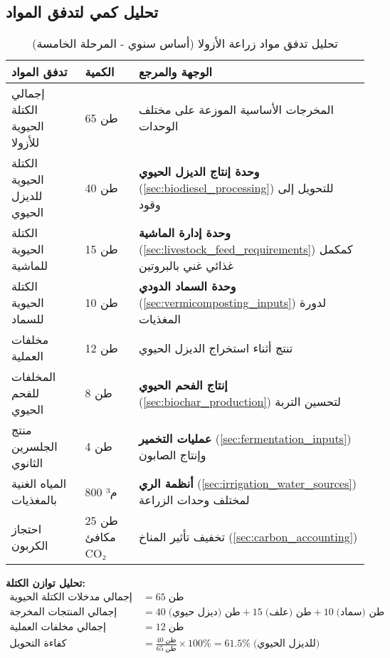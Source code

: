 \subsection{تحليل كمي لتدفق المواد}
\begin{table}[h]
\centering
\caption{تحليل تدفق مواد زراعة الأزولا (أساس سنوي - المرحلة الخامسة)}
\label{tab:azolla_material_flow}
\begin{tabular}{|p{3cm}|p{2cm}|p{8cm}|}
\hline
\textbf{تدفق المواد} & \textbf{الكمية} & \textbf{الوجهة والمرجع} \\
\hline
إجمالي الكتلة الحيوية للأزولا & 65 طن & المخرجات الأساسية الموزعة على مختلف الوحدات \\
\hline
الكتلة الحيوية للديزل الحيوي & 40 طن & \textbf{وحدة إنتاج الديزل الحيوي} (\ref{sec:biodiesel_processing}) للتحويل إلى وقود \\
\hline
الكتلة الحيوية للماشية & 15 طن & \textbf{وحدة إدارة الماشية} (\ref{sec:livestock_feed_requirements}) كمكمل غذائي غني بالبروتين \\
\hline
الكتلة الحيوية للسماد & 10 طن & \textbf{وحدة السماد الدودي} (\ref{sec:vermicomposting_inputs}) لدورة المغذيات \\
\hline
مخلفات العملية & 12 طن & تنتج أثناء استخراج الديزل الحيوي \\
\hline
المخلفات للفحم الحيوي & 8 طن & \textbf{إنتاج الفحم الحيوي} (\ref{sec:biochar_production}) لتحسين التربة \\
\hline
منتج الجلسرين الثانوي & 4 طن & \textbf{عمليات التخمير} (\ref{sec:fermentation_inputs}) وإنتاج الصابون \\
\hline
المياه الغنية بالمغذيات & 800 م³ & \textbf{أنظمة الري} (\ref{sec:irrigation_water_sources}) لمختلف وحدات الزراعة \\
\hline
احتجاز الكربون & 25 طن مكافئ CO₂ & تخفيف تأثير المناخ (\ref{sec:carbon_accounting}) \\
\hline
\end{tabular}
\end{table}

\textbf{تحليل توازن الكتلة:}
\begin{align*}
\text{إجمالي مدخلات الكتلة الحيوية للمعالجة} &= 65\; \text{طن} \\
\text{إجمالي المنتجات المخرجة} &= 40\; \text{طن (ديزل حيوي)} + 15\; \text{طن (علف)} + 10\; \text{طن (سماد)} \\
\text{إجمالي مخلفات العملية} &= 12\; \text{طن} \\
\text{كفاءة التحويل} &= \frac{40\; \text{طن}}{65\; \text{طن}} \times 100\% = 61.5\%\; \text{(للديزل الحيوي)}
\end{align*}

